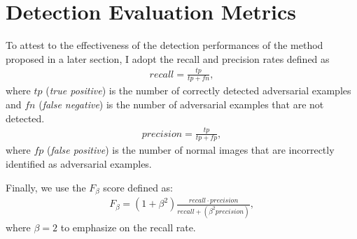 \section{Detection Evaluation Metrics}
To attest to the effectiveness of the detection performances of the method
proposed in a later section, I adopt the recall and precision rates defined as
\begin{align} \label{eq:recall}
    recall=\frac{tp}{tp+fn},
\end{align}
where $tp$ (\textit{true positive}) is the number of correctly detected
adversarial examples and $fn$ (\textit{false negative}) is the number of
adversarial examples that are not detected.
\begin{align} \label{eq:precision}
    precision=\frac{tp}{tp+fp},
\end{align}
where $fp$ (\textit{false positive}) is the number of normal images that are
incorrectly identified as adversarial examples.

Finally, we use the $F_{\beta}$ score defined as:
\begin{align} \label{eq:fb}
    F_{\beta}=(1+\beta^{2})\frac{recall\cdot
        precision}{recall+(\beta^{2}precision)},
\end{align}
where $\beta=2$ to emphasize on the recall rate.
